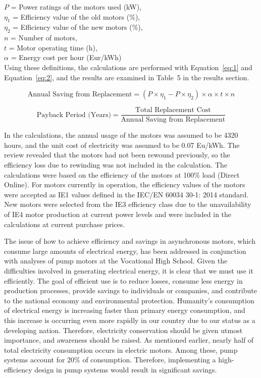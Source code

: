 $P$ = Power ratings of the motors used (kW),\\
$\eta_1$ = Efficiency value of the old motors (\%),\\
$\eta_2$ = Efficiency value of the new motors (\%),\\
$n$ = Number of motors,\\
$t$ = Motor operating time (h),\\
$\alpha$ = Energy cost per hour (Eur/kWh)\\

Using these definitions, the calculations are performed with Equation~\ref{eq:1} and Equation~\ref{eq:2}, and the results are examined in Table~5 in the results section.

\begin{equation}
\label{eq:1}
\text{Annual Saving from Replacement} = (P \times \eta_1 - P \times \eta_2) \times \alpha \times t \times n
\end{equation}

\begin{equation}
\label{eq:2}
\text{Payback Period (Years)} = \frac{\text{Total Replacement Cost}}{\text{Annual Saving from Replacement}}
\end{equation}

In the calculations, the annual usage of the motors was assumed to be 4320 hours, and the unit cost of electricity was assumed to be 0.07 Eu/kWh. The review revealed that the motors had not been rewound previously, so the efficiency loss due to rewinding was not included in the calculation. The calculations were based on the efficiency of the motors at 100\% load (Direct Online). For motors currently in operation, the efficiency values of the motors were accepted as IE1 values defined in the IEC/EN 60034 30-1: 2014 standard. New motors were selected from the IE3 efficiency class due to the unavailability of IE4 motor production at current power levels and were included in the calculations at current purchase prices.

The issue of how to achieve efficiency and savings in asynchronous motors, which consume large amounts of electrical energy, has been addressed in conjunction with analyses of pump motors at the Vocational High School. Given the difficulties involved in generating electrical energy, it is clear that we must use it efficiently. The goal of efficient use is to reduce losses, consume less energy in production processes, provide savings to individuals or companies, and contribute to the national economy and environmental protection. Humanity's consumption of electrical energy is increasing faster than primary energy consumption, and this increase is occurring even more rapidly in our country due to our status as a developing nation. Therefore, electricity conservation should be given utmost importance, and awareness should be raised. As mentioned earlier, nearly half of total electricity consumption occurs in electric motors. Among these, pump systems account for 20\% of consumption. Therefore, implementing a high-efficiency design in pump systems would result in significant savings.


